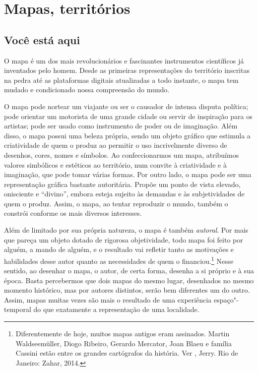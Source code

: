 \part{Mapas, territórios}
\removeepigraph

\chapter{Você está aqui}

O mapa é um dos mais revolucionários e fascinantes instrumentos
científicos já inventados pelo homem. Desde as primeiras representações
do território inscritas na pedra até as plataformas digitais atualizadas
a todo instante, o mapa tem mudado e condicionado nossa compreensão do
mundo.

O mapa pode nortear um viajante ou ser o causador de intensa disputa
política; pode orientar um motorista de uma grande cidade ou servir de
inspiração para os artistas; pode ser usado como instrumento de poder ou
de imaginação. Além disso, o mapa possui uma beleza própria, sendo um
objeto gráfico que estimula a criatividade de quem o produz ao permitir
o uso incrivelmente diverso de desenhos, cores, nomes e símbolos. Ao
confeccionarmos um mapa, atribuímos valores simbólicos e estéticos ao
território, num convite à criatividade e à imaginação, que pode tomar
várias formas. Por outro lado, o mapa pode ser uma representação gráfica
bastante autoritária. Propõe um ponto de vista elevado, onisciente e
``divino'', embora esteja sujeito às demandas e às subjetividades de
quem o produz. Assim, o mapa, ao tentar reproduzir o mundo, também o
constrói conforme os mais diversos interesses.

Além de limitado por sua própria natureza, o mapa é também
\emph{autoral}. Por mais que pareça um objeto dotado de rigorosa
objetividade, todo mapa foi feito por alguém, a mando de alguém, e o
resultado vai refletir tanto as motivações e habilidades desse autor
quanto as necessidades de quem o financiou.\footnote{Diferentemente de
  hoje, muitos mapas antigos eram assinados. Martin Waldseemüller, Diogo
  Ribeiro, Gerardo Mercator, Joan Blaeu e família Cassini estão entre os
  grandes cartógrafos da história. Ver , Jerry. {} Rio de Janeiro: Zahar, 2014.} Nesse
sentido, ao desenhar o mapa, o autor, de certa forma, desenha a si
próprio e à sua época. Basta percebermos que dois mapas do mesmo lugar,
desenhados no mesmo momento histórico, mas por autores distintos, serão
bem diferentes um do outro. Assim, mapas muitas vezes são mais o
resultado de uma experiência espaço"-temporal do que exatamente a
representação de uma localidade.

